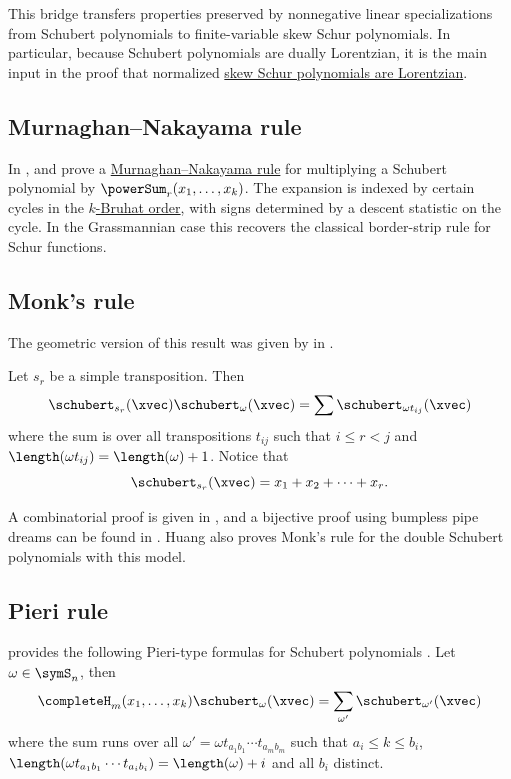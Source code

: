 This bridge transfers properties preserved by nonnegative linear
specializations from Schubert polynomials to finite-variable skew Schur
polynomials.  In particular, because Schubert polynomials are dually
Lorentzian, it is the main input in the proof that normalized
\hyperref[schurSkew]{skew Schur polynomials are Lorentzian}.


\subsection[schubertMurnaghanNakayama]{Murnaghan--Nakayama rule}

In \cite{MorrisonSottile2018},  and 
prove a \hyperref[murnaghanNakayamaRule]{Murnaghan--Nakayama rule} for
multiplying a Schubert polynomial by
$\powerSum_r(x_1,\dotsc,x_k)$.
The expansion is indexed by certain cycles in the \hyperref[bruhatOrder]{$k$-Bruhat order},
with signs determined by a descent statistic on the cycle.
In the Grassmannian case this recovers the classical border-strip rule for
Schur functions.

\subsection[schubertMonksRule]{Monk's rule}

The geometric version of this result was given by  in \cite{Monk1959}.

Let $s_r$ be a simple transposition. Then
\[
\schubert_{s_r}(\xvec) \schubert_\omega(\xvec) = \sum \schubert_{\omega t_{ij}}(\xvec)
\]
where the sum is over all transpositions $t_{ij}$ such that $i\leq r \lt j$ and
$\length(\omega t_{ij}) = \length(\omega)+1$.
Notice that
\[
\schubert_{s_r}(\xvec) = x_1+x_2+\dotsb + x_r.
\]

A combinatorial proof is given in \cite{CoskunTaskin2018}, and a bijective proof using bumpless pipe
dreams can be found in \cite{Huang2020x}.
Huang also proves Monk's rule for the double Schubert polynomials with this model.

\subsection[schubertPieriRule]{Pieri rule}

 provides the following Pieri-type formulas for Schubert
polynomials \cite{Sottile1996}.
Let $\omega \in \symS_n$, then
\[
\completeH_{m}(x_1,\dotsc,x_k) \schubert_\omega(\xvec) = \sum_{\omega'} \schubert_{\omega'}(\xvec)
\]
where the sum runs over all $\omega' = \omega t_{a_1b_1}\dotsm t_{a_mb_m}$ such that $a_i \leq k \leq b_i$,
$\length(\omega t_{a_1b_1}\dotsm t_{a_ib_i}) = \length(\omega)+i$ and all $b_i$ distinct.


